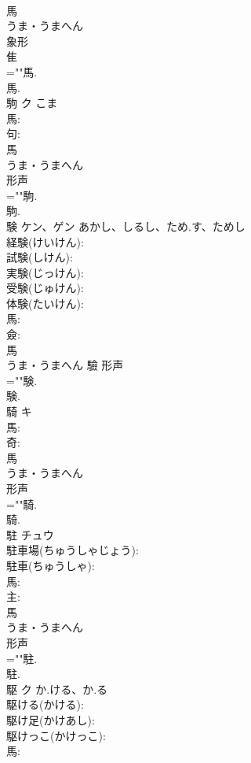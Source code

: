 \documentclass[8pt]{extreport}
\begin{document}
\begin{CJK}{UTF8}{min}
\\	馬	
\\	うま・うまへん	
\\	象形 
\\	隹 
\\	=""馬.
\\	馬.
\\	駒	ク	こま		
\\	馬: 
\\	句: 
\\	馬	
\\	うま・うまへん	
\\	形声 
\\	=""駒.
\\	駒.
\\	験	ケン、ゲン	あかし、しるし、ため.す、ためし		
\\	経験(けいけん): 
\\	試験(しけん): 
\\	実験(じっけん): 
\\	受験(じゅけん): 
\\	体験(たいけん): 
\\	馬: 
\\	僉: 
\\	馬	
\\	うま・うまへん	驗	形声 
\\	=""験.
\\	験.
\\	騎	キ			
\\	馬: 
\\	奇: 
\\	馬	
\\	うま・うまへん	
\\	形声 
\\	=""騎.
\\	騎.
\\	駐	チュウ			
\\	駐車場(ちゅうしゃじょう): 
\\	駐車(ちゅうしゃ): 
\\	馬: 
\\	主: 
\\	馬	
\\	うま・うまへん	
\\	形声 
\\	=""駐.
\\	駐.
\\	駆	ク	か.ける、か.る		
\\	駆ける(かける): 
\\	駆け足(かけあし): 
\\	駆けっこ(かけっこ): 
\\	馬: 

\end{CJK}
\end{document}
